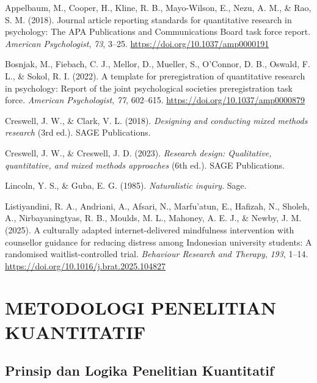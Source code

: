 \documentclass[
  indonesian,
  letterpaper,
  DIV=11,
  numbers=noendperiod]{scrreprt}
\newlength{\cslhangindent}
\newenvironment{CSLReferences}[2] %
 {\begin{list}{}{%
  \setlength{\itemindent}{0pt}
  \setlength{\leftmargin}{0pt}
  \setlength{\parsep}{0pt}
  \ifodd #1
   \setlength{\leftmargin}{\cslhangindent}
   \setlength{\itemindent}{-1\cslhangindent}
  \fi
  \setlength{\itemsep}{#2\baselineskip}}}
 {\end{list}}
\begin{document}
\label{refs--8}
\begin{CSLReferences}{1}{0}
Appelbaum, M., Cooper, H., Kline, R. B., Mayo-Wilson, E., Nezu, A. M.,
\& Rao, S. M. (2018). Journal article reporting standards for
quantitative research in psychology: The APA Publications and
Communications Board task force report. \emph{American Psychologist},
\emph{73}, 3--25. \url{https://doi.org/10.1037/amp0000191}

Bosnjak, M., Fiebach, C. J., Mellor, D., Mueller, S., O'Connor, D. B.,
Oswald, F. L., \& Sokol, R. I. (2022). A template for preregistration of
quantitative research in psychology: Report of the joint psychological
societies preregistration task force. \emph{American Psychologist},
\emph{77}, 602--615. \url{https://doi.org/10.1037/amp0000879}

Creswell, J. W., \& Clark, V. L. (2018). \emph{Designing and conducting
mixed methods research} (3rd ed.). SAGE Publications.

Creswell, J. W., \& Creswell, J. D. (2023). \emph{Research design:
Qualitative, quantitative, and mixed methods approaches} (6th ed.). SAGE
Publications.

Lincoln, Y. S., \& Guba, E. G. (1985). \emph{Naturalistic inquiry}.
Sage.

Listiyandini, R. A., Andriani, A., Afsari, N., Marfu'atun, E., Hafizah,
N., Sholeh, A., Nirbayaningtyas, R. B., Moulds, M. L., Mahoney, A. E.
J., \& Newby, J. M. (2025). A culturally adapted internet-delivered
mindfulness intervention with counsellor guidance for reducing distress
among Indonesian university students: A randomised waitlist-controlled
trial. \emph{Behaviour Research and Therapy}, \emph{193}, 1--14.
\url{https://doi.org/10.1016/j.brat.2025.104827}

\end{CSLReferences}

\part{METODOLOGI PENELITIAN KUANTITATIF}

\chapter{Prinsip dan Logika Penelitian
Kuantitatif}\label{prinsip-dan-logika-penelitian-kuantitatif}
\end{document}
